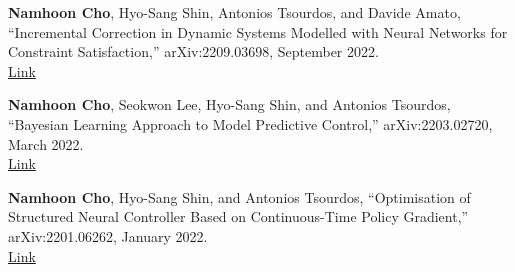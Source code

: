 \begin{enumerate}[itemsep=0.5em, label={[}PP\arabic*{]}]
\item \textbf{Namhoon Cho}, Hyo-Sang Shin, Antonios Tsourdos, and Davide Amato, ``Incremental Correction in Dynamic Systems Modelled with Neural Networks for Constraint Satisfaction,'' arXiv:2209.03698, September 2022. \\
\href{https://arxiv.org/abs/2209.03698}{Link}

\item \textbf{Namhoon Cho}, Seokwon Lee, Hyo-Sang Shin, and Antonios Tsourdos, ``Bayesian Learning Approach to Model Predictive Control,'' arXiv:2203.02720, March 2022. \\
\href{https://arxiv.org/abs/2203.02720}{Link}

\item \textbf{Namhoon Cho}, Hyo-Sang Shin, and Antonios Tsourdos, ``Optimisation of Structured Neural Controller Based on Continuous-Time Policy Gradient,'' arXiv:2201.06262, January 2022. \\
\href{https://arxiv.org/abs/2201.06262}{Link}

\end{enumerate}
\vspace{0.5em}


